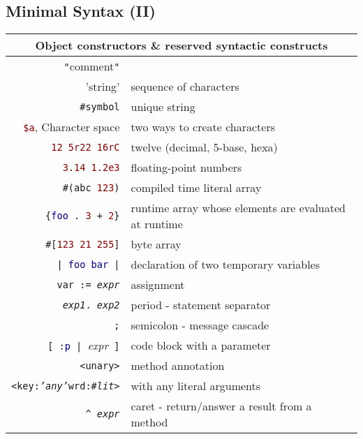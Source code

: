 \documentclass[notumble]{leaflet}
\newcommand{\code}[1]{\foreignlanguage{english}{\texttt{#1}}}
\begin{document}
\subsection{Minimal Syntax (II)}
\noindent
\begin{tabularx}{\linewidth}{@{}rX@{}}
        \toprule
        \multicolumn{2}{c}{Object constructors \& reserved syntactic constructs}\\
        \midrule
        \textcolor{comment}{\code{"}{comment}\code{"}}& \\
        \textcolor{string}{'string'}&sequence of characters\\
        \textcolor{string}{\code{\#symbol}}&unique string\\
        \textcolor{darkRed}{\code{\$a}}, Character space&two ways to create characters\\
        \textcolor{darkRed}{\code{12 5r22 16rC}}&twelve (decimal, 5-base, hexa)\\
        \textcolor{darkRed}{\code{3.14 1.2e3}}&floating-point numbers\\
        \code{\#(\textcolor{string}{abc} \textcolor{darkRed}{123})}&compiled time literal array\\
        \code{\{\textcolor{darkBlue}{foo}\,.\ \textcolor{darkRed}{3}\,+\,\textcolor{darkRed}{2}\}}&runtime array whose elements are evaluated at runtime\\
        \code{\#[\textcolor{darkRed}{123 21 255}]} &byte array \\ 
        \midrule
        
        \code{|\,\textcolor{darkBlue}{foo bar}\,|} &declaration of two temporary variables \\
        \code{var := \emph{expr}}&assignment \\
        \code{\emph{exp1}. \emph{exp2}} &period -  statement separator\\
        \code{;} &semicolon - message cascade\\
        \code{[\,:\textcolor{darkBlue}{p}\,|\,}\emph{expr}\code{\,]} &code block with a parameter \\
        \code{<unary>}&method annotation \\
        \code{<key:\emph{'any'}wrd:\emph{\#lit}>}&with any literal arguments\\
        \code{\textasciicircum\ \emph{expr}} &caret - return/answer a result from a method\\
        \bottomrule
\end{tabularx}
\end{document}
